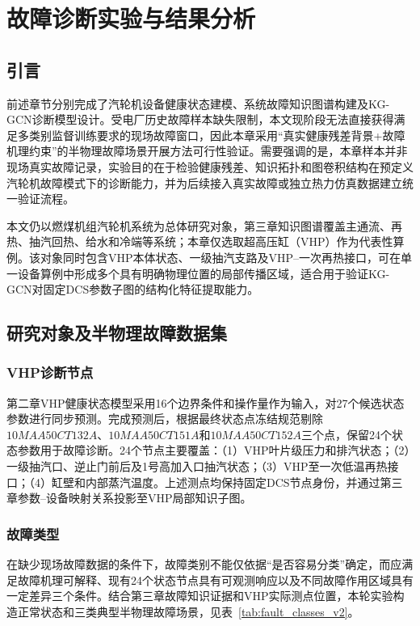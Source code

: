 \section{故障诊断实验与结果分析}
\label{sec:experiments}

\subsection{引言}

前述章节分别完成了汽轮机设备健康状态建模、系统故障知识图谱构建及KG-GCN诊断模型设计。受电厂历史故障样本缺失限制，本文现阶段无法直接获得满足多类别监督训练要求的现场故障窗口，因此本章采用“真实健康残差背景+故障机理约束”的半物理故障场景开展方法可行性验证。需要强调的是，本章样本并非现场真实故障记录，实验目的在于检验健康残差、知识拓扑和图卷积结构在预定义汽轮机故障模式下的诊断能力，并为后续接入真实故障或独立热力仿真数据建立统一验证流程。

本文仍以燃煤机组汽轮机系统为总体研究对象，第三章知识图谱覆盖主通流、再热、抽汽回热、给水和冷端等系统；本章仅选取超高压缸（VHP）作为代表性算例。该对象同时包含VHP本体状态、一级抽汽支路及VHP--一次再热接口，可在单一设备算例中形成多个具有明确物理位置的局部传播区域，适合用于验证KG-GCN对固定DCS参数子图的结构化特征提取能力。

\subsection{研究对象及半物理故障数据集}
\label{subsec:fault_dataset_v2}

\subsubsection{VHP诊断节点}

第二章VHP健康状态模型采用16个边界条件和操作量作为输入，对27个候选状态参数进行同步预测。完成预测后，根据最终状态点冻结规范剔除$10MAA50CT132A$、$10MAA50CT151A$和$10MAA50CT152A$三个点，保留24个状态参数用于故障诊断。24个节点主要覆盖：（1）VHP叶片级压力和排汽状态；（2）一级抽汽口、逆止门前后及1号高加入口抽汽状态；（3）VHP至一次低温再热接口；（4）缸壁和内部蒸汽温度。上述测点均保持固定DCS节点身份，并通过第三章参数--设备映射关系投影至VHP局部知识子图。

\subsubsection{故障类型}

在缺少现场故障数据的条件下，故障类别不能仅依据“是否容易分类”确定，而应满足故障机理可解释、现有24个状态节点具有可观测响应以及不同故障作用区域具有一定差异三个条件。结合第三章故障知识证据和VHP实际测点位置，本轮实验构造正常状态和三类典型半物理故障场景，见表~\ref{tab:fault_classes_v2}。

